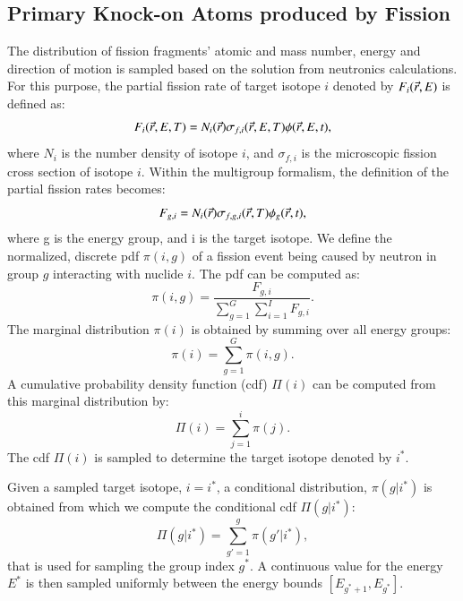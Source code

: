 \documentclass{anstrans}
\begin{document}
\subsection{Primary Knock-on Atoms produced by Fission}\label{sec:pka_pdf}
The distribution of fission fragments' atomic and mass number, energy and direction of motion is sampled based on the solution
from neutronics calculations.
For this purpose, the partial fission rate of target isotope $i$ denoted by $F_i(\vec{r},E)$ is defined as:
\begin{equation}
    F_i(\vec{r},E, T)  = N_i(\vec{r}) \sigma_{f,i}(\vec{r}, E, T) \phi(\vec{r}, E, t),
\end{equation}
where $N_i$ is the number density of isotope $i$, and $ \sigma_{f,i}$ is the microscopic fission cross section of isotope $i$.
Within the multigroup formalism, the definition of the partial fission rates becomes:
\begin{equation}
    F_{g,i} = N_{i}(\vec{r}) \sigma_{f,g,i}(\vec{r}, T) \phi_g(\vec{r}, t),
\end{equation}
where g is the energy group, and i is the target isotope. We define the normalized, discrete pdf $\pi(i,g)$ of a fission event being caused by neutron in  group
$g$ interacting with nuclide $i$. The pdf can be computed as:
\begin{equation}\label{eq:fission_pdf}
  \pi(i,g) = \frac{F_{g,i}}{\sum\limits_{g=1}^G \sum\limits_{i=1}^I  F_{g,i}}.
\end{equation}
The marginal distribution $\pi(i)$ is obtained by summing over all energy groups:
\begin{equation}
  \pi(i) = \sum\limits_{g=1}^G \pi(i,g).
\end{equation}
A cumulative probability density function (cdf) $\Pi(i)$ can be computed from this marginal distribution by:
\begin{equation}\label{eq:cdf_marg}
   \Pi(i) = \sum\limits_{j=1}^i \pi(j).
\end{equation}
The cdf $ \Pi(i)$  is sampled to determine the target isotope denoted by $i^*$.

Given a sampled target isotope, $i = i^*$, a conditional distribution, $\pi(g |  i^*)$ is obtained from which we compute the conditional cdf $\Pi(g |  i^*)$:
\begin{equation}\label{eq:cdf_cond}
  \Pi(g |  i^*) = \sum\limits_{g'=1}^g  \pi(g' |  i^*),
\end{equation}
that is used for sampling the group index $g^*$. A continuous value for the energy $E^*$ is then sampled uniformly between the energy bounds $[E_{g^*+1}, E_{g^*}]$.
\end{document}
